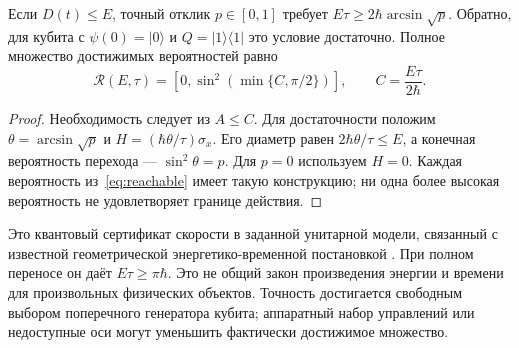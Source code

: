 \begin{corollary}\label{cor:frontier}
{Если $D(t)\leq E$, точный отклик $p\in[0,1]$ требует $E\tau\geq2\hbar\arcsin\sqrt p$. Обратно, для кубита с $\psi(0)=|0\rangle$ и $Q=|1\rangle\langle1|$ это условие достаточно. Полное множество достижимых вероятностей равно}
\begin{equation}\label{eq:reachable}
 \mathcal R(E,\tau)=[0,\sin^2(\min\{C,\pi/2\})],\qquad C=\frac{E\tau}{2\hbar}.
\end{equation}
\end{corollary}
\begin{proof}
{Необходимость следует из $A\leq C$. Для достаточности положим $\theta=\arcsin\sqrt p$ и $H=(\hbar\theta/\tau)\sigma_x$. Его диаметр равен $2\hbar\theta/\tau\leq E$, а конечная вероятность перехода --- $\sin^2\theta=p$. Для $p=0$ используем $H=0$. Каждая вероятность из~\eqref{eq:reachable} имеет такую конструкцию; ни одна более высокая вероятность не удовлетворяет границе действия.}
\end{proof}
{Это квантовый сертификат скорости в заданной унитарной модели, связанный с известной геометрической энергетико-временной постановкой \cite{AA}. При полном переносе он даёт $E\tau\geq\pi\hbar$. Это не общий закон произведения энергии и времени для произвольных физических объектов. Точность достигается свободным выбором поперечного генератора кубита; аппаратный набор управлений или недоступные оси могут уменьшить фактически достижимое множество.}

